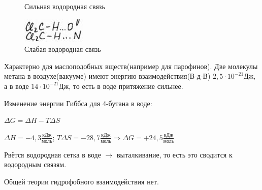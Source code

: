 \begin{lecture}[Седьмая]
\begin{lecSection}
\begin{figure}[H]
\begin{minipage}[h]{0.2\linewidth}
		\caption{Сильная водородная связь}
	\end{minipage}
	\hfill
	\begin{minipage}[h]{0.2\linewidth}
		\centering\includegraphics[width=\linewidth]{lecture_07/pic4}
		\caption{Слабая водородная связь}
	\end{minipage}
	\hfill
	\end{figure}
	
	\end{lecSection}
	
	\begin{lecSection}
	\begin{flushleft}
	Характерно для маслоподобных вществ(например для парофинов). Две молекулы метана в воздухе(вакууме) имеют энергию взаимодействия(В-д-В) $2,5 \cdot 10^{-21}\text{Дж}$, а в воде $14\cdot 10^{-21}\text{Дж}$, то есть в воде притяжение сильнее.
	\par Изменение энергии Гиббса для 4-бутана в воде:
	\par $\Delta G = \Delta H - T\Delta S$
	\par $\Delta H = -4,3\frac{\text{кДж}}{\text{моль}}$; $T\Delta S = -28,7\frac{\text{кДж}}{\text{моль}} \Rightarrow \Delta G = +24,5 \frac{\text{кДж}}{\text{моль}}$ 
	\par Рвётся водородная сетка в воде $\rightarrow$ выталкивание, то есть это сводится к водородным связям.
	\par Общей теории гидрофобного взаимодействия нет.
	\end{flushleft}
	\end{lecSection}
	

\end{lecture}
